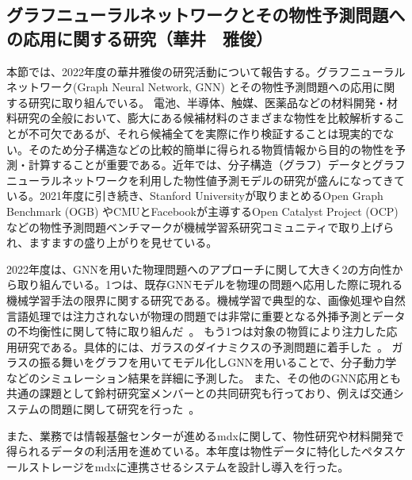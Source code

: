 \subsection{グラフニューラルネットワークとその物性予測問題への応用に関する研究（華井　雅俊）}

本節では、2022年度の華井雅俊の研究活動について報告する。グラフニューラルネットワーク(Graph Neural Network, GNN) とその物性予測問題への応用に関する研究に取り組んでいる。
電池、半導体、触媒、医薬品などの材料開発・材料研究の全般において、膨大にある候補材料のさまざまな物性を比較解析することが不可欠であるが、それら候補全てを実際に作り検証することは現実的でない。そのため分子構造などの比較的簡単に得られる物質情報から目的の物性を予測・計算することが重要である。近年では、分子構造（グラフ）データとグラフニューラルネットワークを利用した物性値予測モデルの研究が盛んになってきている。2021年度に引き続き、Stanford Universityが取りまとめるOpen Graph Benchmark (OGB) やCMUとFacebookが主導するOpen Catalyst Project (OCP) などの物性予測問題ベンチマークが機械学習系研究コミュニティで取り上げられ、ますますの盛り上がりを見せている。

2022年度は、GNNを用いた物理問題へのアプローチに関して大きく2の方向性から取り組んでいる。1つは、既存GNNモデルを物理の問題へ応用した際に現れる機械学習手法の限界に関する研究である。機械学習で典型的な、画像処理や自然言語処理では注力されないが物理の問題では非常に重要となる外挿予測とデータの不均衡性に関して特に取り組んだ~\cite{xsig-limin,xsig-takashige}。
もう1つは対象の物質により注力した応用研究である。具体的には、ガラスのダイナミクスの予測問題に着手した~\cite{botan}。 ガラスの振る舞いをグラフを用いてモデル化しGNNを用いることで、分子動力学などのシミュレーション結果を詳細に予測した。
また、その他のGNN応用とも共通の課題として鈴村研究室メンバーとの共同研究も行っており、例えば交通システムの問題に関して研究を行った~\cite{stgtrans}。

また、業務では情報基盤センターが進めるmdxに関して、物性研究や材料開発で得られるデータの利活用を進めている。本年度は物性データに特化したペタスケールストレージをmdxに連携させるシステムを設計し導入を行った。


